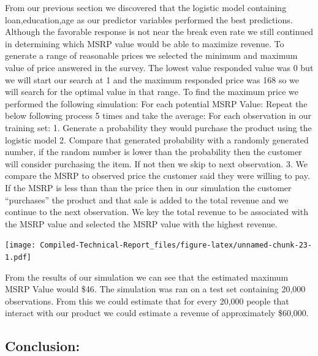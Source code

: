 \documentclass[]{article}
\begin{document}
From our previous section we discovered that the logistic model
containing loan,education,age as our predictor variables performed the
best predictions. Although the favorable response is not near the break
even rate we still continued in determining which MSRP value would be
able to maximize revenue. To generate a range of reasonable prices we
selected the minimum and maximum value of price answered in the survey.
The lowest value responded value was 0 but we will start our search at 1
and the maximum responded price was 168 so we will search for the
optimal value in that range. To find the maximum price we performed the
following simulation: For each potential MSRP Value: Repeat the below
following process 5 times and take the average: For each observation in
our training set: 1. Generate a probability they would purchase the
product using the logistic model 2. Compare that generated probability
with a randomly generated number, if the random number is lower than the
probability then the customer will consider purchasing the item. If not
then we skip to next observation. 3. We compare the MSRP to observed
price the customer said they were willing to pay. If the MSRP is less
than than the price then in our simulation the customer ``purchases''
the product and that sale is added to the total revenue and we continue
to the next observation. We key the total revenue to be associated with
the MSRP value and selected the MSRP value with the highest revenue.

\texttt{[image: Compiled-Technical-Report\_files/figure-latex/unnamed-chunk-23-1.pdf]}

From the results of our simulation we can see that the estimated maximum
MSRP Value would \$46. The simulation was ran on a test set containing
20,000 observations. From this we could estimate that for every 20,000
people that interact with our product we could estimate a revenue of
approximately \$60,000.

\hypertarget{conclusion}{%
\subsection{Conclusion:}\label{conclusion}}
\end{document}
